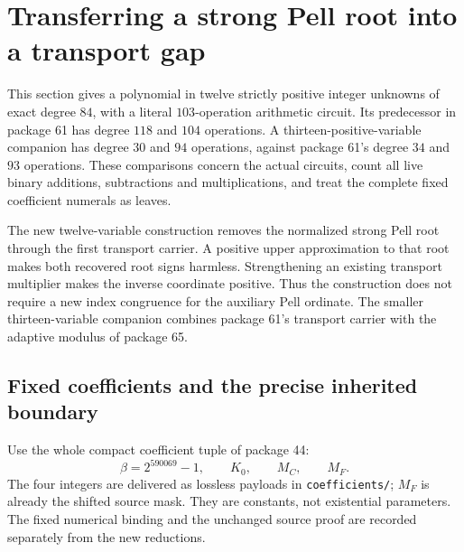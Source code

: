 \section{Transferring a strong Pell root into a transport gap}
\label{sec:root-transfer}

This section gives a polynomial in twelve strictly positive integer
unknowns of exact degree $84$, with a literal $103$-operation arithmetic
circuit.  Its predecessor in package 61 has degree $118$ and $104$
operations.  A thirteen-positive-variable companion has degree $30$ and
$94$ operations, against package 61's degree $34$ and $93$ operations.
These comparisons concern the actual circuits, count all live binary
additions, subtractions and multiplications, and treat the complete fixed
coefficient numerals as leaves.

The new twelve-variable construction removes the normalized strong Pell
root through the first transport carrier.  A positive upper approximation
to that root makes both recovered root signs harmless.  Strengthening an
existing transport multiplier makes the inverse coordinate positive.
Thus the construction does not require a new index congruence for the
auxiliary Pell ordinate.  The smaller thirteen-variable companion combines
package 61's transport carrier with the adaptive modulus of package 65.

\subsection{Fixed coefficients and the precise inherited boundary}

Use the whole compact coefficient tuple of package 44:
\[
 \beta=2^{590069}-1,\qquad K_0,\qquad M_C,\qquad M_F.
\]
The four integers are delivered as lossless payloads in
\texttt{coefficients/}; $M_F$ is already the shifted source mask.
They are constants, not existential parameters.  The fixed numerical
binding and the unchanged source proof are recorded separately from the
new reductions.

